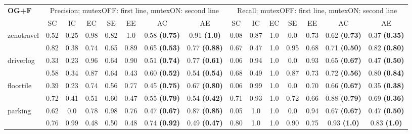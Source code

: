 \documentclass{ecai}
\begin{document}
\begin{table*}
\begin{center}
{			\rule{0pt}{8pt}
			
			\begin{tabular}{lccccc|cc||ccccc|cc}
				\textbf{OG+F} & \multicolumn{7}{c}{Precision; mutexOFF: first line, mutexON: second line} & \multicolumn{7}{c}{Recall; mutexOFF: first line, mutexON: second line} 
				\\
				\cline{2-15}
				& SC & IC & EC & SE & EE & AC & AE & SC & IC & EC & SE & EE & AC & AE \\ 
				\cline{2-15}
				
				\multirow{2}{*}{zenotravel} & 0.52 &	0.25 &	0.98 &	0.82 &	1.0	& 0.58 \textbf{(0.75)} &	0.91 \textbf{(1.0)} & 0.08	& 0.87 & 1.0 &	0.0 &	0.73 &	0.62 \textbf{(0.73)} &	0.37 \textbf{(0.35)} \\
				& 0.82	& 0.38 &	0.74 &	0.65 &	0.89 &	0.65 \textbf{(0.53)} &	0.77 \textbf{(0.88)} & 0.67	& 0.47 &	1.0	& 0.95 & 0.68 &	0.71 \textbf{(0.50)} & 0.82 \textbf{(0.80)} \\
				
				
				\cline{2-15}
				
				\multirow{2}{*}{driverlog} & 0.33 &	0.23 &	0.96 &	0.64 &	0.90 &	0.51 \textbf{(0.74)} &	0.77 \textbf{(0.61)} &  0.06 &	0.94 &	1.0 &	0.0 &	0.93 &	0.65 \textbf{(0.67)} &	0.47 \textbf{(0.50)} \\
				& 0.58 &	0.34 &	0.87 &	0.64 &	0.43 &	0.60 \textbf{(0.52)} &	0.54 \textbf{(0.54)} &  0.68 &	0.49 &	1.0 &	0.87 &	0.73 &	0.72 \textbf{(0.56)} &	0.80 \textbf{(0.84)} \\
				
				\cline{2-15}
				
				\multirow{2}{*}{floortile} & 0.39 &	0.23 &	0.74 &	0.56 &	0.77 &	0.45 \textbf{(0.75)} & 0.67 \textbf{(0.80)} & 0.06	& 0.99 &	1.0	& 0.0	& 0.70	& 0.66 \textbf{(0.67)} & 0.35 \textbf{(0.38)} \\
				& 0.72 &	0.41 &	0.51 &	0.60 &	0.47 &	0.55 \textbf{(0.79)} & 0.54 \textbf{(0.42)} & 0.71	& 0.93 &	1.0	& 0.72	& 0.66	& 0.88 \textbf{(0.79)} & 0.69 \textbf{(0.36)} \\
				
				
				\cline{2-15}
				
				\multirow{2}{*}{parking} & 0.62 &	0.0 &	0.78 &	0.98 &	0.76 &	0.47 \textbf{(0.67)} &	0.87 \textbf{(0.85)} &  0.05 &	1.0 &	1.0 &	0.0 &	0.94 &	0.67 \textbf{(0.67)} &	0.47 \textbf{(0.50)} \\
				& 0.76	& 0.99 &	0.48 &	0.50 &	0.48 &	0.74 \textbf{(0.92)} &	0.49 \textbf{(0.47)} & 0.80 &	1.0 &	1.0	& 0.90 &	0.75 &	0.93 \textbf{(1.0)} &	0.83 \textbf{(1.0)} \\
				\hline
			\end{tabular}
			
}
\end{center}
\end{table*}
\end{document}
